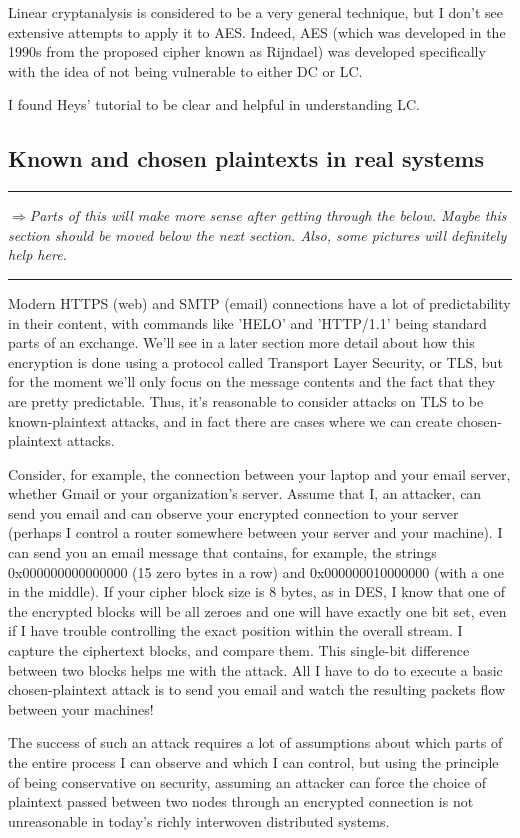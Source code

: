 \documentclass[%
 aip,
 jmp,%
 amsmath,amssymb,
 reprint,%
]{revtex4-1}
\def\outlinecomment#1{\hrule{\color{Blue}$\Rightarrow${\small\em #1}}\hrule}
\begin{document}
Linear cryptanalysis is considered to be a very general technique, but
I don't see extensive attempts to apply it to AES.  Indeed, AES (which
was developed in the 1990s from the proposed cipher known as Rijndael)
was developed specifically with the idea of not being vulnerable to
either DC or LC.

I found Heys' tutorial to be clear and helpful in understanding LC.

\subsection{Known and chosen plaintexts in real systems}

\outlinecomment{Parts of this will make more sense after getting
  through the below.  Maybe this section should be moved below the
  next section.  Also, some pictures will definitely help here.}

Modern HTTPS (web) and SMTP (email) connections have a lot of
predictability in their content, with commands like 'HELO' and
'HTTP/1.1' being standard parts of an exchange.  We'll see in a later
section more detail about how this encryption is done using a protocol
called Transport Layer Security, or TLS, but for the moment we'll only
focus on the message contents and the fact that they are pretty
predictable.  Thus, it's reasonable to consider attacks on TLS to be
known-plaintext attacks, and in fact there are cases where we can
create chosen-plaintext attacks.

Consider, for example, the connection between your laptop and your
email server, whether Gmail or your organization's server.  Assume
that I, an attacker, can send you email and can observe your encrypted
connection to your server (perhaps I control a router somewhere
between your server and your machine).  I can send you an email
message that contains, for example, the strings 0x000000000000000 (15
zero bytes in a row) and 0x000000010000000 (with a one in the middle).
If your cipher block size is 8 bytes, as in DES, I know that one of
the encrypted blocks will be all zeroes and one will have exactly one
bit set, even if I have trouble controlling the exact position within
the overall stream.  I capture the ciphertext blocks, and compare
them.  This single-bit difference between two blocks helps me with the
attack.  All I have to do to execute a basic chosen-plaintext attack
is to send you email and watch the resulting packets flow between your
machines!

The success of such an attack requires a lot of assumptions about
which parts of the entire process I can observe and which I can
control, but using the principle of being conservative on security,
assuming an attacker can force the choice of plaintext passed between
two nodes through an encrypted connection is not unreasonable in
today's richly interwoven distributed systems.
\end{document}
